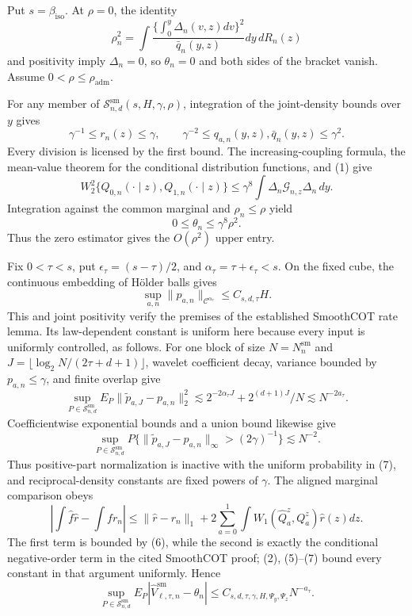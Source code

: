 Put \(s=\beta_{\mathrm{iso}}\).  At \(\rho=0\), the identity
\[
\rho_n^2=\int\frac{\{\int_0^y\Delta_n(v,z)dv\}^2}{\bar q_n(y,z)}dy\,dR_n(z) \tag{1}
\]
and positivity imply \(\Delta_n=0\), so \(\theta_n=0\) and both sides of the bracket vanish.  Assume \(0<\rho\le\rho_{\mathrm{adm}}\).

For any member of \(\mathcal S^{\mathrm{sm}}_{n,d}(s,H,\gamma,\rho)\), integration of the joint-density bounds over \(y\) gives
\[
\gamma^{-1}\le r_n(z)\le\gamma,
\qquad
\gamma^{-2}\le q_{a,n}(y,z),\bar q_n(y,z)\le\gamma^2. \tag{2}
\]
Every division is licensed by the first bound.  The increasing-coupling formula, the mean-value theorem for the conditional distribution functions, and (1) give
\[
W_2^2\{Q_{0,n}(\cdot\mid z),Q_{1,n}(\cdot\mid z)\}
\le\gamma^8\int\Delta_n\mathcal G_{n,z}\Delta_n\,dy. \tag{3}
\]
Integration against the common marginal and \(\rho_n\le\rho\) yield
\[
0\le\theta_n\le\gamma^8\rho^2. \tag{4}
\]
Thus the zero estimator gives the \(O(\rho^2)\) upper entry.

Fix \(0<\tau<s\), put \(\epsilon_\tau=(s-\tau)/2\), and \(\alpha_\tau=\tau+\epsilon_\tau<s\).  On the fixed cube, the continuous embedding of H\"older balls gives
\[
\sup_{a,n}\|p_{a,n}\|_{\mathcal C^{\alpha_\tau}}
\le C_{s,d,\tau}H. \tag{5}
\]
This and joint positivity verify the premises of the established SmoothCOT rate lemma.  Its law-dependent constant is uniform here because every input is uniformly controlled, as follows.  For one block of size \(N=N_n^{\mathrm{sm}}\) and \(J=\lfloor\log_2N/(2\tau+d+1)\rfloor\), wavelet coefficient decay, variance bounded by \(p_{a,n}\le\gamma\), and finite overlap give
\[
\sup_{P\in\mathcal S^{\mathrm{sm}}_{n,d}}
E_P\|\widetilde p_{a,J}-p_{a,n}\|_2^2
\lesssim2^{-2\alpha_\tau J}+2^{(d+1)J}/N
\lesssim N^{-2a_\tau}. \tag{6}
\]
Coefficientwise exponential bounds and a union bound likewise give
\[
\sup_{P\in\mathcal S^{\mathrm{sm}}_{n,d}}
P\{\|\widetilde p_{a,J}-p_{a,n}\|_\infty>(2\gamma)^{-1}\}
\lesssim N^{-2}. \tag{7}
\]
Thus positive-part normalization is inactive with the uniform probability in (7), and reciprocal-density constants are fixed powers of \(\gamma\).  The aligned marginal comparison obeys
\[
\left|\int\widehat f\widehat r-\int fr_n\right|
\le\|\widehat r-r_n\|_1
+2\sum_{a=0}^1\int W_1(\widehat Q_a^z,Q_a^z)\widehat r(z)dz. \tag{8}
\]
The first term is bounded by (6), while the second is exactly the conditional negative-order term in the cited SmoothCOT proof; (2), (5)--(7) bound every constant in that argument uniformly.  Hence
\[
\sup_{P\in\mathcal S^{\mathrm{sm}}_{n,d}}
E_P|\widehat V_{\ell,\tau,n}^{\mathrm{sm}}-\theta_n|
\le C_{s,d,\tau,\gamma,H,\Psi_y,\Psi_z}N^{-a_\tau}. \tag{9}
\]

